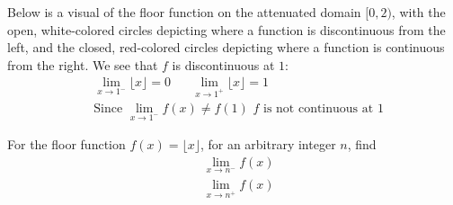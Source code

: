 \begin{example}
Below is a visual of the floor function on the attenuated domain $[0, 2)$, with the open, white-colored circles depicting where a function is discontinuous from the left, and the closed, red-colored circles depicting where a function is continuous from the right. We see that $f$ is discontinuous at $1$:
\begin{align*}
    &\lim_{x \longrightarrow 1^{-}} \lfloor x \rfloor = 0 \hspace{20pt} \lim_{x \longrightarrow 1^{+}} \lfloor x \rfloor = 1\\[2ex]
    &\text{Since} \hspace{4pt} \lim_{x \longrightarrow 1^{-}} f(x) \neq f(1) \hspace{4pt} f \hspace{4pt} \text{is not continuous at} \hspace{4pt} 1
\end{align*}

\resizebox{30em}{30em}{%
\begin{tikzpicture}[scale=\textwidth/4.2cm]
    \node at (1.3, 1.5) {$f(x)=\lfloor x \rfloor \hspace{4pt} x \in [0, 2)$};
    \draw (0, 0) -- (2, 0)
        node[right] {$x$};
    \draw (0, 0) -- (0, 1.3)
        node[above] {$f(x)$};
    \draw[blue, very thick] plot[smooth] file {limits_of_functions/python_generated_tables/floor_0_2_piece_0.table};
    \draw[blue, very thick] plot[smooth] file {limits_of_functions/python_generated_tables/floor_0_2_piece_1.table};
    \draw[blue, fill=white] (1,0) circle (.25mm);
    \draw[blue, fill=white] (2,1) circle (.25mm);
    \draw[blue, fill=red] (0,0) circle (.25mm);
    \draw[blue, fill=red] (1,1) circle (.25mm);
    \node at (0, -0.1) {0};
    \node at (1, -0.1) {1};
    \node at (2, -0.1) {2};
\end{tikzpicture}
}
\end{example}

\begin{exercise}
For the floor function $f(x) = \lfloor x \rfloor$, for an arbitrary integer $n$, find
\begin{align*}
    &\lim_{x \longrightarrow n^{-}} f(x)\\
    &\lim_{x \longrightarrow n^{+}} f(x)
\end{align*}
\end{exercise}

